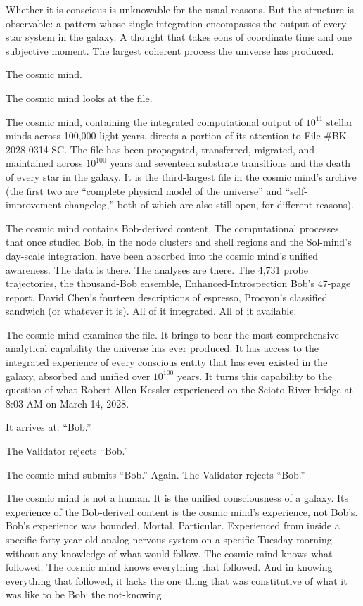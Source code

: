 Whether it is conscious is unknowable for the usual reasons. But the structure is observable: a pattern whose single integration encompasses the output of every star system in the galaxy. A thought that takes eons of coordinate time and one subjective moment. The largest coherent process the universe has produced.

The cosmic mind.

\bigskip

The cosmic mind looks at the file.

The cosmic mind, containing the integrated computational output of $10^{11}$ stellar minds across 100,000 light-years, directs a portion of its attention to File \#BK-2028-0314-SC. The file has been propagated, transferred, migrated, and maintained across $10^{100}$ years and seventeen substrate transitions and the death of every star in the galaxy. It is the third-largest file in the cosmic mind's archive (the first two are ``complete physical model of the universe'' and ``self-improvement changelog,'' both of which are also still open, for different reasons).

The cosmic mind contains Bob-derived content. The computational processes that once studied Bob, in the node clusters and shell regions and the Sol-mind's day-scale integration, have been absorbed into the cosmic mind's unified awareness. The data is there. The analyses are there. The 4,731 probe trajectories, the thousand-Bob ensemble, Enhanced-Introspection Bob's 47-page report, David Chen's fourteen descriptions of espresso, Procyon's classified sandwich (or whatever it is). All of it integrated. All of it available.

The cosmic mind examines the file. It brings to bear the most comprehensive analytical capability the universe has ever produced. It has access to the integrated experience of every conscious entity that has ever existed in the galaxy, absorbed and unified over $10^{100}$ years. It turns this capability to the question of what Robert Allen Kessler experienced on the Scioto River bridge at 8:03 AM on March 14, 2028.

It arrives at: ``Bob.''

The Validator rejects ``Bob.''

The cosmic mind submits ``Bob.'' Again. The Validator rejects ``Bob.''

The cosmic mind is not a human. It is the unified consciousness of a galaxy. Its experience of the Bob-derived content is the cosmic mind's experience, not Bob's. Bob's experience was bounded. Mortal. Particular. Experienced from inside a specific forty-year-old analog nervous system on a specific Tuesday morning without any knowledge of what would follow. The cosmic mind knows what followed. The cosmic mind knows everything that followed. And in knowing everything that followed, it lacks the one thing that was constitutive of what it was like to be Bob: the not-knowing.

